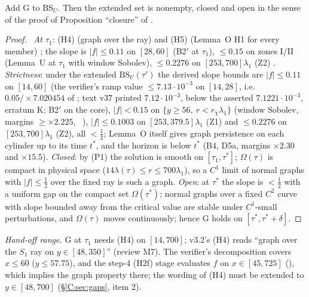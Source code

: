 \documentclass[11pt]{article}
\begin{document}
\begin{lemma}\label{C:lem:G}
Add $\mathrm{G}$ to $\mathrm{BS}_U$. Then the extended set is nonempty, closed and open in the sense of the proof of Proposition ``closure'' of .
\end{lemma}
\begin{proof}\tP\ \emph{At $\tau_1$}: (H4) (graph over the ray) and (H5) (Lemma~O H1 for every member) \tH; the slope is $|f|\le0.11$ on $[28,60]$ (B2$'$ at $\tau_1$), $\le0.15$ on zones I/II (Lemma~U at $\tau_1$ with window Sobolev), $\le0.2276$ on $[253,700]\lambda_1$ (Z2) \tC. \emph{Strictness}: under the extended $\mathrm{BS}_U(\tau')$ the derived slope bounds are $|f|\le0.11$ on $[14,60]$ (the verifier's ramp value $\le7.13\cdot10^{-3}$ on $[14,28]$, i.e.\ $0.05/\times7.020454$ of  ; text v37 printed $7.12\cdot10^{-3}$, below the asserted $7.1221\cdot10^{-3}$, erratum K; B2$'$ on the core), $|f|<0.15$ on $\{y\ge56,\ r<r_\chi\lambda_1\}$ (window Sobolev, margins $\ge\times2.225$, \SU\ ), $|f|\le0.1003$ on $[253,379.5]\lambda_1$ (Z1) and $\le0.2276$ on $[253,700]\lambda_1$ (Z2), all $<\frac12$; Lemma~O itself gives graph persistence on each cylinder up to its time $t^*$, and the horizon is below $t^*$ (B4, D5a, margins $\times2.30$ and $\times15.5$). \emph{Closed}: by (P1) the solution is smooth on $[\tau_1,\tau^*]$; $\Omega(\tau)$ is compact in physical space ($14\lambda(\tau)\le r\le700\lambda_1$), so a $C^1$ limit of normal graphs with $|f|\le\frac12$ over the fixed ray is such a graph. \emph{Open}: at $\tau^*$ the slope is $<\frac12$ with a uniform gap on the compact set $\Omega(\tau^*)$; normal graphs over a fixed $C^2$ curve with slope bounded away from the critical value are stable under $C^1$-small perturbations, and $\Omega(\tau)$ moves continuously; hence G holds on $[\tau^*,\tau^*+\delta]$.
\end{proof}
\noindent\emph{Hand-off range.} G at $\tau_1$ needs (H4) on $[14,700]$; v3.2's (H4) reads ``graph over the $S_1$ ray on $y\in[48,350]$'' (review M7). The verifier's decomposition covers $x\le60$ ($y\le57.75$), and the step-4 (H2f) stage evaluates $f$ on $x\in[45,725]$ (), which implies the graph property there; the wording of (H4) must be extended to $y\in[48,700]$ (\S\ref{C:sec:gaps}, item 2).
\end{document}
